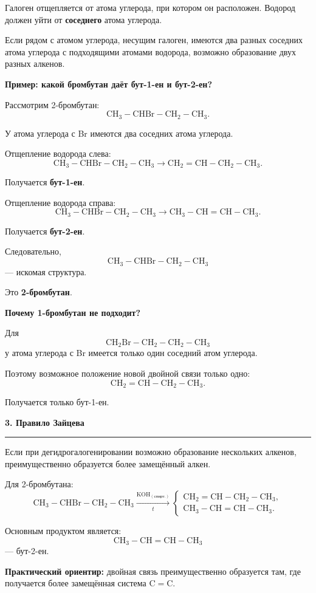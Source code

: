 \documentclass[a4paper,12pt]{article}
\newcommand{\topic}[1]{%
    \vspace{0.5em}
    {\Large\bfseries\textcolor{darkaccent}{#1}}\par
    \vspace{0.25em}
    {\color{accent}\rule{\linewidth}{0.7pt}}
    \vspace{0.4em}
}
\newcommand{\subtopic}[1]{%
    \vspace{0.35em}
    {\large\bfseries\textcolor{accent}{#1}}\par
}
\newcommand{\important}[1]{\textbf{\textcolor{darkaccent}{#1}}}
\begin{document}
Галоген отщепляется от атома углерода, при котором он расположен. Водород должен уйти от \important{соседнего} атома углерода.

Если рядом с атомом углерода, несущим галоген, имеются два разных соседних атома углерода с подходящими атомами водорода, возможно образование двух разных алкенов.

\subtopic{Пример: какой бромбутан даёт бут-1-ен и бут-2-ен?}

Рассмотрим 2-бромбутан:
\[
\mathrm{CH_3-CHBr-CH_2-CH_3}.
\]

У атома углерода с Br имеются два соседних атома углерода.

Отщепление водорода слева:
\[
\mathrm{CH_3-CHBr-CH_2-CH_3}
\longrightarrow
\mathrm{CH_2=CH-CH_2-CH_3}.
\]

Получается \important{бут-1-ен}.

Отщепление водорода справа:
\[
\mathrm{CH_3-CHBr-CH_2-CH_3}
\longrightarrow
\mathrm{CH_3-CH=CH-CH_3}.
\]

Получается \important{бут-2-ен}.

Следовательно,
\[
\boxed{\mathrm{CH_3-CHBr-CH_2-CH_3}}
\]
--- искомая структура.

Это \important{2-бромбутан}.

\subtopic{Почему 1-бромбутан не подходит?}

Для
\[
\mathrm{CH_2Br-CH_2-CH_2-CH_3}
\]
у атома углерода с Br имеется только один соседний атом углерода.

Поэтому возможное положение новой двойной связи только одно:
\[
\mathrm{CH_2=CH-CH_2-CH_3}.
\]

Получается только бут-1-ен.


\topic{3. Правило Зайцева}

Если при дегидрогалогенировании возможно образование нескольких алкенов, преимущественно образуется более замещённый алкен.

Для 2-бромбутана:
\[
\mathrm{CH_3-CHBr-CH_2-CH_3}
\xrightarrow[\ t\ ]{\mathrm{KOH_{(спирт.)}}}
\begin{cases}
\mathrm{CH_2=CH-CH_2-CH_3},\\[2mm]
\mathrm{CH_3-CH=CH-CH_3}.
\end{cases}
\]

Основным продуктом является:
\[
\boxed{\mathrm{CH_3-CH=CH-CH_3}}
\]
--- бут-2-ен.

\important{Практический ориентир:} двойная связь преимущественно образуется там, где получается более замещённая система \(\mathrm{C=C}\).
\end{document}
